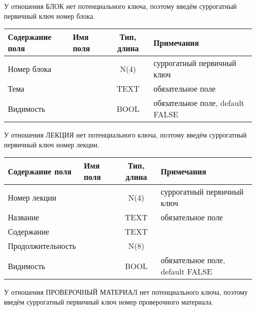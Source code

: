 \documentclass[a4paper,14pt]{article}
\begin{document}

У отношения БЛОК нет потенциального ключа, поэтому введём суррогатный первичный ключ номер блока.

\begin{table}[H]
	\begin{tabular}{|l|l|c|l|}
		\hline
		Содержание поля & Имя поля & Тип, длина & Примечания                       \\ \hline
		Номер блока     &          &    N(4)    & суррогатный первичный ключ       \\ \hline
		Тема            &          &    TEXT    & обязательное поле                \\ \hline
		Видимость       &          &    BOOL    & обязательное поле, default FALSE \\ \hline
	\end{tabular}
\end{table}


У отношения ЛЕКЦИЯ нет потенциального ключа, поэтому введём суррогатный первичный ключ номер лекции.

\begin{table}[H]
	\begin{tabular}{|l|l|c|l|}
		\hline
		Содержание поля   & Имя поля & Тип, длина & Примечания                       \\ \hline
		Номер лекции      &          &    N(4)    & суррогатный первичный ключ       \\ \hline
		Название          &          &    TEXT    & обязательное поле                \\ \hline
		Содержание        &          &    TEXT    &                                  \\ \hline
		Продолжительность &          &    N(8)    &                                  \\ \hline
		Видимость         &          &    BOOL    & обязательное поле, default FALSE \\ \hline
	\end{tabular}
\end{table}

У отношения ПРОВЕРОЧНЫЙ МАТЕРИАЛ нет потенциального ключа, поэтому введём суррогатный первичный ключ номер проверочного материала.
\end{document}
